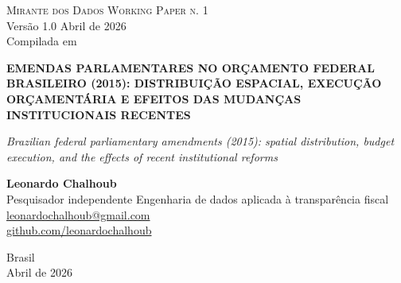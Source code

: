 \documentclass[12pt,a4paper,oneside]{article}
\begin{document}
\begin{titlepage}
  \begin{center}
    \vspace*{1.5cm}
    {\small\textsc{Mirante dos Dados \quad\textbar\quad Working Paper n. 1}}\\
    {\small Versão 1.0 \textemdash{} Abril de 2026}\\[2pt]
    {\footnotesize Compilada em \COMPILESTAMP\ \textbullet\ \texttt{\COMPILESHA}}

    \vfill

    {\LARGE\bfseries
     EMENDAS PARLAMENTARES NO ORÇAMENTO FEDERAL BRASILEIRO
     (2015): DISTRIBUIÇÃO ESPACIAL, EXECUÇÃO ORÇAMENTÁRIA
     E EFEITOS DAS MUDANÇAS INSTITUCIONAIS RECENTES}

    \vspace{1cm}
    {\large\itshape
     Brazilian federal parliamentary amendments (2015):
     spatial distribution, budget execution, and the effects of recent
     institutional reforms}

    \vfill

    {\large\textbf{Leonardo Chalhoub}}\\[4pt]
    {\small Pesquisador independente \textemdash{} Engenharia de dados aplicada à transparência fiscal}\\[2pt]
    {\small\href{mailto:leonardochalhoub@gmail.com}{leonardochalhoub@gmail.com}}\\
    {\small\href{https://github.com/leonardochalhoub}{github.com/leonardochalhoub}}

    \vfill

    {\small Brasil \\ Abril de 2026}
  \end{center}
\end{titlepage}

\end{document}
